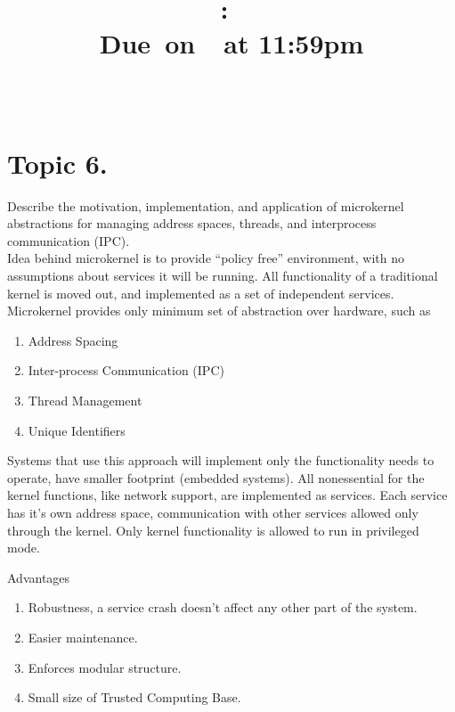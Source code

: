 \documentclass{article}
\title{
    \vspace{2in}
    \textmd{\textbf{\hmwkClass:\ \hmwkTitle}}\\
        \normalsize\vspace{0.1in}\small{Due\ on\ \hmwkDueDate\ at 11:59pm}\\
        \vspace{0.1in}\large{\textit{\hmwkClassInstructor\ \hmwkClassTime}}
    \vspace{3in}
}
\author{\textbf{\hmwkAuthorName}}
\date{}
\begin{document}
\maketitle

\pagebreak

        \section{Topic 6.}  Describe the motivation, implementation, and application of microkernel
        abstractions for managing address spaces, threads, and interprocess communication (IPC). \\

             Idea behind microkernel is to provide ``policy free'' environment, with no assumptions about
             services it will be running. All functionality of a traditional kernel is moved out, and
             implemented as a set of independent services. Microkernel provides only minimum set of
             abstraction over hardware, such as
             \begin{enumerate}[-, leftmargin = 0.7cm, nosep]
                 \item Address Spacing
                 \item Inter-process Communication (IPC)
                 \item Thread Management
                 \item Unique Identifiers
             \end{enumerate}
        Systems that use this approach will implement only the functionality needs to operate, have
        smaller footprint (embedded systems). All nonessential for the kernel functions, like network support, are
        implemented as services. Each service has it's own address space, communication with other
        services allowed only through the kernel. Only kernel functionality is allowed to run in privileged mode. 
        \vspace{0.2cm}

        Advantages
        \begin{enumerate}[-, leftmargin = 0.7cm, nosep]
            \item Robustness, a service crash doesn't affect any other part of the system.
            \item Easier maintenance.
            \item Enforces modular structure.
            \item Small size of Trusted Computing Base.
        \end{enumerate}
        \vspace{0.2cm}
\end{document}
